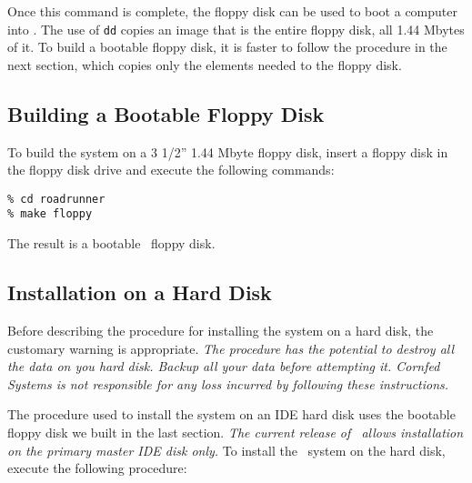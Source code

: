 \noindent Once this command is complete, the floppy disk can be used to
boot a computer into \roadrunner.  The use of {\tt dd} copies an image
that is the entire floppy disk, all 1.44 Mbytes of it.  To build a bootable
floppy disk, it is faster to follow the procedure in the next section,
which copies only the elements needed to the floppy disk.


\subsection*{Building a Bootable Floppy Disk}

To build the system on a 3 1/2'' 1.44 Mbyte floppy disk, insert a floppy
disk in the floppy disk drive and execute the following commands:

\begin{verbatim}
% cd roadrunner
% make floppy
\end{verbatim}

\noindent The result is a bootable \roadrunner\  floppy disk.


\subsection*{Installation on a Hard Disk}

Before describing the procedure for installing the system on a hard
disk, the customary warning is appropriate.  {\em The procedure has
the potential to destroy all the data on you hard disk.  Backup all your
data before attempting it.  Cornfed Systems is not responsible for any
loss incurred by following these instructions.}

The procedure used to install the system on an IDE hard disk uses the
bootable floppy disk we built in the last section.  {\em The current
release of \roadrunner\  allows installation on the primary master
IDE disk only.}  To install the \roadrunner\  system on the hard disk,
execute the following procedure:

